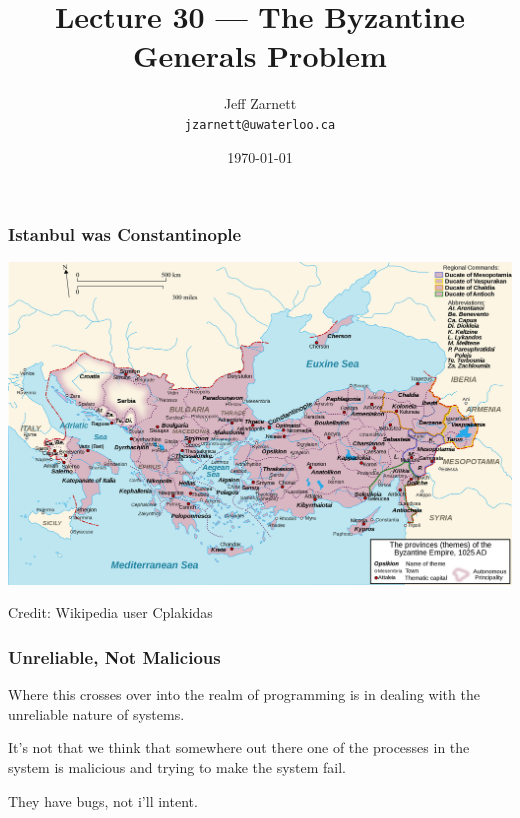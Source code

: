 

\title{Lecture 30 --- The Byzantine Generals Problem }

\author{Jeff Zarnett \\ \small \texttt{jzarnett@uwaterloo.ca}}
\date{\today}




\begin{frame}
  \titlepage

 \end{frame}


\begin{frame}
\frametitle{Istanbul was Constantinople}

\begin{center}
	\includegraphics[width=\textwidth]{images/byzantium}
\end{center}

Credit: Wikipedia user Cplakidas 


\end{frame}

\begin{frame}
\frametitle{Unreliable, Not Malicious}

Where this crosses over into the realm of programming is in dealing with the unreliable nature of systems.

It's not that we think that somewhere out there one of the processes in the system is malicious and trying to make the system fail.

They have bugs, not i'll intent.
\end{frame}



